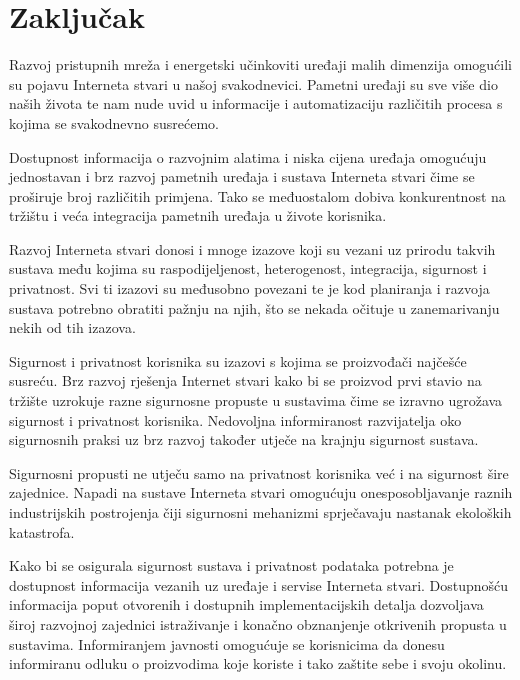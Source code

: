 \documentclass[times, utf8, diplomski]{fer}
\begin{document}
\chapter{Zaključak}
Razvoj pristupnih mreža i energetski učinkoviti uređaji malih dimenzija omogućili su pojavu Interneta stvari u našoj svakodnevici. Pametni uređaji su sve više dio naših života te nam nude uvid u informacije i automatizaciju različitih procesa s kojima se svakodnevno susrećemo. 

Dostupnost informacija o razvojnim alatima i niska cijena uređaja omogućuju jednostavan i brz razvoj pametnih uređaja i sustava Interneta stvari čime se proširuje broj različitih primjena. Tako se međuostalom dobiva konkurentnost na tržištu i veća integracija pametnih uređaja u živote korisnika.

Razvoj Interneta stvari donosi i mnoge izazove koji su vezani uz prirodu takvih sustava među kojima su raspodijeljenost, heterogenost, integracija, sigurnost i privatnost. Svi ti izazovi su međusobno povezani te je kod planiranja i razvoja sustava potrebno obratiti pažnju na njih, što se nekada očituje u zanemarivanju nekih od tih izazova.

Sigurnost i privatnost korisnika su izazovi s kojima se proizvođači najčešće susreću. Brz razvoj rješenja Internet stvari kako bi se proizvod prvi stavio na tržište uzrokuje razne sigurnosne propuste u sustavima čime se izravno ugrožava sigurnost i privatnost korisnika. Nedovoljna informiranost razvijatelja oko sigurnosnih praksi uz brz razvoj također utječe na krajnju sigurnost sustava.

Sigurnosni propusti ne utječu samo na privatnost korisnika već i na sigurnost šire zajednice. Napadi na sustave Interneta stvari omogućuju onesposobljavanje raznih industrijskih postrojenja čiji sigurnosni mehanizmi sprječavaju nastanak ekoloških katastrofa.

Kako bi se osigurala sigurnost sustava i privatnost podataka potrebna je dostupnost informacija vezanih uz uređaje i servise Interneta stvari. Dostupnošću informacija poput otvorenih i dostupnih implementacijskih detalja dozvoljava široj razvojnoj zajednici istraživanje i konačno obznanjenje otkrivenih propusta u sustavima. Informiranjem javnosti omogućuje se korisnicima da donesu informiranu odluku o proizvodima koje koriste i tako zaštite sebe i svoju okolinu.  



\listoffigures
\listoftables
\end{document}
